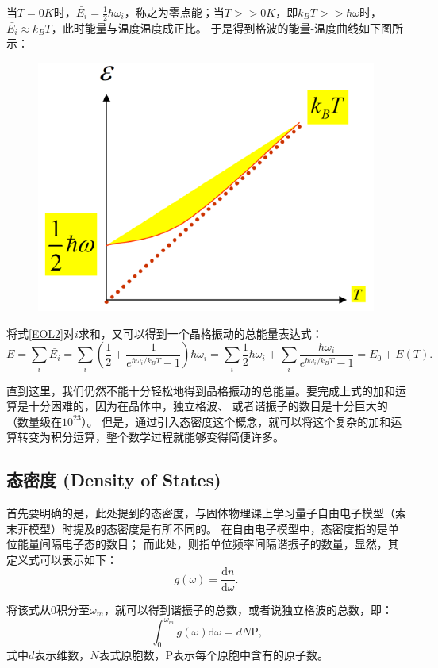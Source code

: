 \documentclass[declarePage]{ecnuthesis}
\begin{document}
当$T=0K$时，$\bar{E_i}=\frac{1}{2}\hbar \omega_i$，称之为零点能；当$T>>0K$，即$k_BT>>\hbar \omega$时，$\bar{E_i} \approx k_BT$，此时能量与温度温度成正比。%
于是得到格波的能量-温度曲线如下图所示：
\begin{figure}[htb]
    \centering
    \includegraphics[width=.5\textwidth]{ET.png}
\end{figure}

将式\ref{EOL2}对$i$求和，又可以得到一个晶格振动的总能量表达式：
\begin{equation}
    E = \sum_i \bar{E_i} = \sum_i \left(\frac{1}{2} + \frac{1}{e^{\hbar \omega_i / k_B T}-1}\right)\hbar \omega_i = \sum_i \frac{1}{2}\hbar \omega_i + \sum_i \frac{\hbar \omega_i}{e^{\hbar \omega_i / k_B T}-1} = E_0 + E(T) \text{.} \label{EOC2}
\end{equation}

直到这里，我们仍然不能十分轻松地得到晶格振动的总能量。要完成上式的加和运算是十分困难的，因为在晶体中，独立格波、%
或者谐振子的数目是十分巨大的（数量级在$10^{23}$）。%
但是，通过引入态密度这个概念，就可以将这个复杂的加和运算转变为积分运算，整个数学过程就能够变得简便许多。

\subsection{态密度 (Density of States)}

首先要明确的是，此处提到的态密度，与固体物理课上学习量子自由电子模型（索末菲模型）时提及的态密度是有所不同的。%
在自由电子模型中，态密度指的是单位能量间隔电子态的数目；%
而此处，则指单位频率间隔谐振子的数量，显然，其定义式可以表示如下：
\begin{equation}
    g(\omega) = \frac{\mathrm{d}n}{\mathrm{d}\omega} \text{.}
\end{equation}

将该式从0积分至$\omega_m$，就可以得到谐振子的总数，或者说独立格波的总数，即：
\begin{equation}
    \int_{0}^{\omega_m} g(\omega) \mathrm{d}\omega = dN \mathrm{P} \text{,}
\end{equation}
式中$d$表示维数，$N$表式原胞数，P表示每个原胞中含有的原子数。
\end{document}

